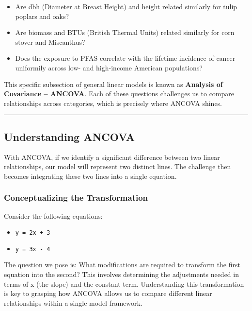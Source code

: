 \documentclass[
  letterpaper,
  DIV=11,
  numbers=noendperiod]{scrreprt}
\providecommand{\tightlist}{%
  \setlength{\itemsep}{0pt}\setlength{\parskip}{0pt}}\usepackage{longtable,booktabs,array}
\begin{document}
\begin{itemize}
\item
  Are dbh (Diameter at Breast Height) and height related similarly for
  tulip poplars and oaks?
\item
  Are biomass and BTUs (British Thermal Units) related similarly for
  corn stover and Miscanthus?
\item
  Does the exposure to PFAS correlate with the lifetime incidence of
  cancer uniformily across low- and high-income American populations?
\end{itemize}

This specific subsection of general linear models is known as
\textbf{Analysis of Covariance -- ANCOVA}. Each of these questions
challenges us to compare relationships across categories, which is
precisely where ANCOVA shines.

\begin{center}\rule{0.5\linewidth}{0.5pt}\end{center}

\subsection{Understanding ANCOVA}\label{understanding-ancova}

With ANCOVA, if we identify a significant difference between two linear
relationships, our model will represent two distinct lines. The
challenge then becomes integrating these two lines into a single
equation.

\subsubsection{Conceptualizing the
Transformation}\label{conceptualizing-the-transformation}

Consider the following equations:

\begin{itemize}
\tightlist
\item
  \texttt{y\ =\ 2x\ +\ 3}
\item
  \texttt{y\ =\ 3x\ -\ 4}
\end{itemize}

The question we pose is: What modifications are required to transform
the first equation into the second? This involves determining the
adjustments needed in terms of x (the slope) and the constant term.
Understanding this transformation is key to grasping how ANCOVA allows
us to compare different linear relationships within a single model
framework.
\end{document}
